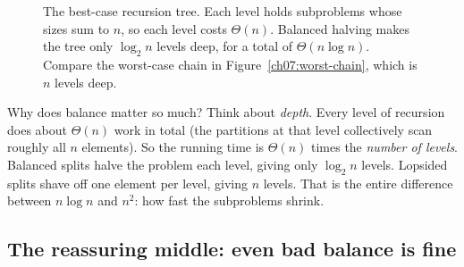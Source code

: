 \begin{figure}[h]
\centering
{}
\caption{The best-case recursion tree. Each level holds subproblems whose sizes
sum to $n$, so each level costs $\Theta(n)$. Balanced halving makes the tree only
$\log_2 n$ levels deep, for a total of $\Theta(n \log n)$. Compare the worst-case
chain in Figure~\ref{ch07:worst-chain}, which is $n$ levels deep.}
\label{ch07:best-tree}
\end{figure}

\begin{intuitionbox}
Why does balance matter so much? Think about \emph{depth}. Every level of
recursion does about $\Theta(n)$ work in total (the partitions at that level
collectively scan roughly all $n$ elements). So the running time is
$\Theta(n)$ times the \emph{number of levels}. Balanced splits halve the problem
each level, giving only $\log_2 n$ levels. Lopsided splits shave off one element
per level, giving $n$ levels. That is the entire difference between
$n \log n$ and $n^2$: how fast the subproblems shrink.
\end{intuitionbox}

\subsection{The reassuring middle: even bad balance is fine}

